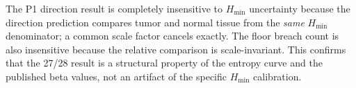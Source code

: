 \documentclass[12pt,a4paper]{article}
\newcommand{\Hmin}{H_{\min}}
\begin{document}
The P1 direction result is completely insensitive to $\Hmin$ uncertainty
because the direction prediction compares tumor and normal tissue from the
\emph{same} $\Hmin$ denominator; a common scale factor cancels exactly.
The floor breach count is also insensitive because the relative comparison
is scale-invariant. This confirms that the 27/28 result is a structural
property of the entropy curve and the published beta values, not an artifact
of the specific $\Hmin$ calibration.
\end{document}
